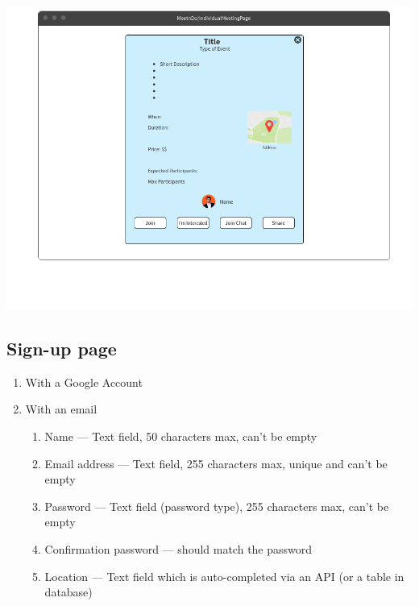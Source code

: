 \documentclass[conference]{IEEEtran}
\begin{document}
\includegraphics[scale=0.3]{mockups/meeting}

\subsection{Sign-up page}

\begin{enumerate}
    \item With a Google Account
    \item With an email
    \begin{enumerate}
        \item Name --- Text field, 50 characters max, can’t be empty
        \item Email address --- Text field, 255 characters max, unique and can’t be empty
        \item Password --- Text field (password type), 255 characters max, can’t be empty
        \item Confirmation password --- should match the password
        \item Location --- Text field which is auto-completed via an API (or a table in database)
    \end{enumerate}
\end{enumerate}
\end{document}
